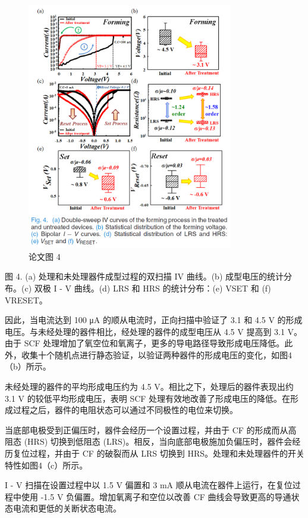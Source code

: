 \begin{figure}[htb]
\centering 
\includegraphics[width=0.80\textwidth]{img/c1m4.png} 
\caption{论文图 4}
\label{Test}
\end{figure}
图 4. (a) 处理和未处理器件成型过程的双扫描 IV 曲线。(b) 成型电压的统计分布。(c) 双极 I - V 曲线。(d) LRS 和 HRS 的统计分布：(e) VSET 和 (f) VRESET。

因此，当电流达到 100 μA 的顺从电流时，正向扫描中验证了 3.1 和 4.5 V 的形成电压。与未经处理的器件相比，经处理的器件的成型电压从 4.5 V 提高到 3.1 V。由于 SCF 处理增加了氧空位和氧离子，更多的导电路径导致形成电压降低。此外，收集十个随机点进行静态验证，以验证两种器件的形成电压的变化，如图4（b）所示。

未经处理的器件的平均形成电压约为 4.5 V。相比之下，处理后的器件表现出约 3.1 V 的较低平均形成电压，表明 SCF 处理有效地改善了形成电压的降低。在形成过程之后，器件的电阻状态可以通过不同极性的电位来切换。

当底部电极受到正偏压时，器件会经历一个设置过程，并由于 CF 的形成而从高阻态 (HRS) 切换到低阻态 (LRS)。相反，当向底部电极施加负偏压时，器件会经历复位过程，并由于 CF 的破裂而从 LRS 切换到 HRS。处理和未处理器件的开关特性如图4（c）所示。

I - V 扫描在设置过程中以 1.5 V 偏置和 3 mA 顺从电流在器件上运行，在复位过程中使用 -1.5 V 负偏置。增加氧离子和空位以改善 CF 曲线会导致更高的导通状态电流和更低的关断状态电流。

